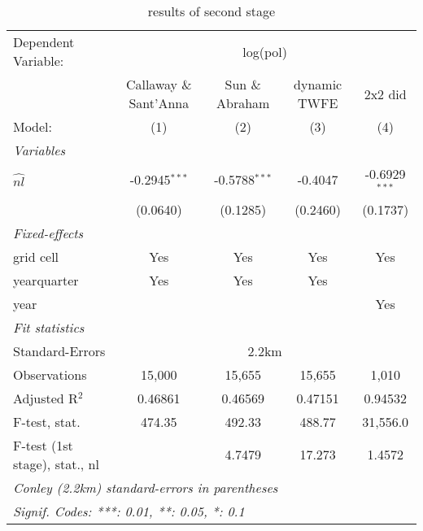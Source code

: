 
\begin{table}[H]
   \caption{\label{tab:estimates0.01} results of second stage}
   \centering
   \begin{adjustbox}{width = \textwidth, center}
      \begin{tabular}{lcccc}
         \tabularnewline \midrule \midrule
         Dependent Variable: & \multicolumn{4}{c}{log(pol)}\\
          & Callaway \& Sant'Anna & Sun \& Abraham & dynamic TWFE &  2x2 did \\ 
         Model:                        & (1)             & (2)             & (3)      & (4)\\  
         \midrule
         \emph{Variables}\\
         $\widehat{nl}$                & -0.2945$^{***}$ & -0.5788$^{***}$ & -0.4047  & -0.6929$^{***}$\\   
                                       & (0.0640)        & (0.1285)        & (0.2460) & (0.1737)\\   
         \midrule
         \emph{Fixed-effects}\\
         grid cell                     & Yes             & Yes             & Yes      & Yes\\  
         yearquarter                   & Yes             & Yes             & Yes      & \\  
         year                          &                 &                 &          & Yes\\  
         \midrule
         \emph{Fit statistics}\\
         Standard-Errors & \multicolumn{4}{c}{2.2km} \\ 
         Observations                  & 15,000          & 15,655          & 15,655   & 1,010\\  
         Adjusted R$^2$                & 0.46861         & 0.46569         & 0.47151  & 0.94532\\  
         F-test, stat.                 & 474.35          & 492.33          & 488.77   & 31,556.0\\  
         F-test (1st stage), stat., nl &                 & 4.7479          & 17.273   & 1.4572\\  
         \midrule \midrule
         \multicolumn{5}{l}{\emph{Conley (2.2km) standard-errors in parentheses}}\\
         \multicolumn{5}{l}{\emph{Signif. Codes: ***: 0.01, **: 0.05, *: 0.1}}\\
      \end{tabular}
   \end{adjustbox}
\end{table}


